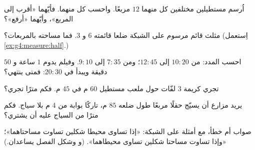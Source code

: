 \begin{exercise}[$\star$]\label{exo:g4:measure:6}
اُرسم مستطيلين مختلفين  كل منهما $12$ مربعًا. واحسب
 كل منهما. فأيّهما «أقرب إلى المربع»، وأيّهما «أرفع»؟
\end{exercise}

\begin{exercise}[$\star$]\label{exo:g4:measure:7}
مثلث قائم مرسوم على الشبكة ضلعا قائمته $6$ و $3$. فما
مساحته بالمربعات؟ (اِستعمل \cref{ex:g4:measure:half}.)
\end{exercise}

\begin{exercise}[$\star$]\label{exo:g4:measure:8}
احسب المدد: من $10{:}20$ إلى $12{:}45$؛ ومن $7{:}35$ إلى
$9{:}10$. وفيلم يدوم $1$ ساعة و $50$ دقيقة ويبدأ في $20{:}30$:
فمتى ينتهي؟
\end{exercise}

\begin{exercise}[$\star$]\label{exo:g4:measure:9}
تجري كريمة $3$ لفّات حول ملعب مستطيل $60$ م في $45$ م. فكم مترًا
تجري؟
\end{exercise}

\begin{exercise}[$\star\star$]\label{exo:g4:measure:10}
يريد مزارع أن يسيّج حقلًا مربعًا طول ضلعه $85$ م، تاركًا
بوابة من $4$ م بلا سياج. فكم مترًا من السياج عليه أن يشتري؟
\end{exercise}

\begin{exercise}[$\star\star$]\label{exo:g4:measure:11}
صواب أم خطأ، مع أمثلة على الشبكة: «إذا تساوى محيطا شكلين
تساوت مساحتاهما»؛ «وإذا تساوت مساحتا شكلين تساوى
محيطاهما».
(و وشكل الفصل يساعدان.)
\end{exercise}

